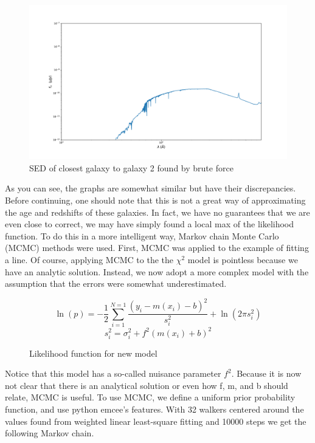 \documentclass{article}
\begin{document}
\begin{figure}[H]
  \centering
\includegraphics[scale=0.25]{SED closest galaxy 2}
\caption{SED of closest galaxy to galaxy 2 found by brute force}
\end{figure}

As you can see, the graphs are somewhat similar but have their discrepancies. Before continuing, one
should note that this is not a great way of approximating the age and redshifts of these galaxies.
In fact, we have no guarantees that we are even close to correct, we may have simply found a local
max of the likelihood function. To do this in a more intelligent way, Markov chain Monte Carlo
(MCMC) methods were used. First, MCMC was applied to the example of fitting a line. Of course,
applying MCMC to the the $\chi ^2$ model is pointless because we have an analytic solution. Instead,
we now adopt a more complex model with the assumption that the errors were somewhat underestimated.

\begin{figure}[H]
\[\ln({p}) = -\frac{1}{2} \sum_{i=1}^{N = 1} \frac{(y_i - m(x_i) - b)^2}{s_i^2} + \ln({2\pi s_i^2})\]
\[ s_i^2 = \sigma_{i}^2 + f^2 (m(x_i) + b)^2\]
\caption{Likelihood function for new model}
\end{figure}

Notice that this model has a so-called nuisance parameter $f^2$. Because it is now not clear that
there is an analytical solution or even how f, m, and b should
relate, MCMC is useful. To use MCMC, we define a uniform prior probability function, and use python
emcee's features. With 32 walkers centered around the values found from weighted linear least-square fitting and
10000 steps we get the following Markov chain.
\end{document}
